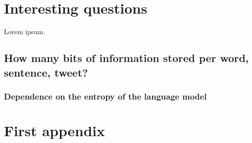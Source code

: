 \documentclass[draft]{IIBproject}
\begin{document}
\newpage
\section{Interesting questions}

Lorem ipsum.

\subsection{How many bits of information stored per word, sentence, tweet?}

\subsubsection{Dependence on the entropy of the language model}

\newpage
\footnotesize



\newpage
\appendix

\section{First appendix}
\end{document}
